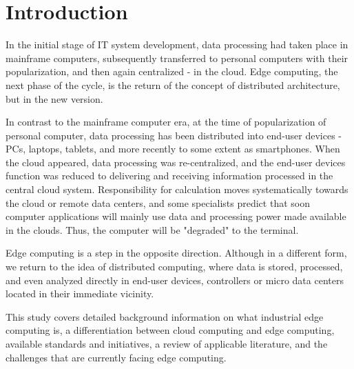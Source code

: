 \section{Introduction}\label{sec:introduction}
In the initial stage of IT system development, data processing had taken place in mainframe computers, subsequently transferred to personal computers with their popularization, and then again centralized - in the cloud. Edge computing, the next phase of the cycle, is the return of the concept of distributed architecture, but in the new version.\par
In contrast to the mainframe computer era, at the time of popularization of personal computer, data processing has been distributed into end-user devices - PCs, laptops, tablets, and more recently to some extent as smartphones. When the cloud appeared, data processing was re-centralized, and the end-user devices function was reduced to delivering and receiving information processed in the central cloud system. Responsibility for calculation moves systematically towards the cloud or remote data centers, and some specialists predict that soon computer applications will mainly use data and processing power made available in the clouds. Thus, the computer will be "degraded" to the terminal.\par
Edge computing is a step in the opposite direction. Although in a different form, we return to the idea of distributed computing, where data is stored, processed, and even analyzed directly in end-user devices, controllers or micro data centers located in their immediate vicinity.\par
This study covers detailed background information on what industrial edge computing is, a differentiation between cloud computing and edge computing, available standards and initiatives, a review of applicable literature, and the challenges that are currently facing edge computing.\par
 
 
